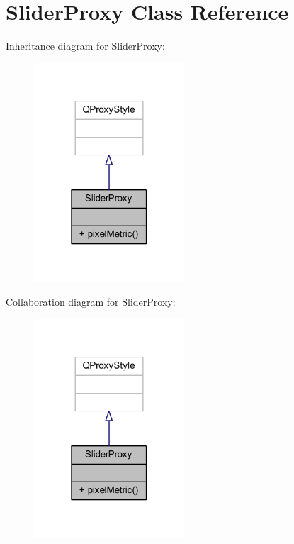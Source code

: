 \hypertarget{class_slider_proxy}{}\section{Slider\+Proxy Class Reference}
\label{class_slider_proxy}


Inheritance diagram for Slider\+Proxy\+:
\nopagebreak
\begin{figure}[H]
\begin{center}
\leavevmode
\includegraphics[width=159pt]{class_slider_proxy__inherit__graph}
\end{center}
\end{figure}


Collaboration diagram for Slider\+Proxy\+:
\nopagebreak
\begin{figure}[H]
\begin{center}
\leavevmode
\includegraphics[width=159pt]{class_slider_proxy__coll__graph}
\end{center}
\end{figure}
